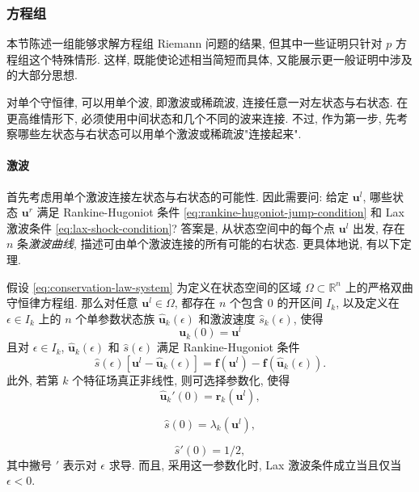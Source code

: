 \subsubsection{方程组}\label{subsec:systems-riemann-problems}

本节陈述一组能够求解方程组 Riemann 问题的结果, 但其中一些证明只针对 $p$ 方程组这个特殊情形. 这样, 既能使论述相当简短而具体, 又能展示更一般证明中涉及的大部分思想.

对单个守恒律, 可以用单个波, 即激波或稀疏波, 连接任意一对左状态与右状态. 在更高维情形下, 必须使用中间状态和几个不同的波来连接. 不过, 作为第一步, 先考察哪些左状态与右状态可以用单个激波或稀疏波"连接起来".

\paragraph*{激波}

首先考虑用单个激波连接左状态与右状态的可能性. 因此需要问: 给定 $\bm{u}^l$, 哪些状态 $\bm{u}^r$ 满足 Rankine-Hugoniot 条件 \eqref{eq:rankine-hugoniot-jump-condition} 和 Lax 激波条件 \eqref{eq:lax-shock-condition}? 答案是, 从状态空间中的每个点 $\bm{u}^l$ 出发, 存在 $n$ 条\emph{激波曲线}, 描述可由单个激波连接的所有可能的右状态. 更具体地说, 有以下定理.

\begin{Theorem}
\label{thm:shock-curves-existence}
假设 \eqref{eq:conservation-law-system} 为定义在状态空间的区域 $\Omega\subset\mathbb{R}^n$ 上的严格双曲守恒律方程组. 那么对任意 $\bm{u}^l\in\Omega$, 都存在 $n$ 个包含 $0$ 的开区间 $I_k$, 以及定义在 $\epsilon\in I_k$ 上的 $n$ 个单参数状态族 $\hat{\bm{u}}_k(\epsilon)$ 和激波速度 $\hat s_k(\epsilon)$, 使得
\begin{equation}\label{eq:shock-curve-base-state}
\bm{u}_k(0)=\bm{u}^l
\end{equation}
且对 $\epsilon\in I_k$, $\hat{\bm{u}}_k(\epsilon)$ 和 $\hat s(\epsilon)$ 满足 Rankine-Hugoniot 条件
\[
\hat s(\epsilon)[\bm{u}^l-\hat{\bm{u}}_k(\epsilon)]=\bm{f}(\bm{u}^l)-\bm{f}(\hat{\bm{u}}_k(\epsilon)).
\]
此外, 若第 $k$ 个特征场真正非线性, 则可选择参数化, 使得
\begin{equation}\label{eq:shock-curve-initial-tangent}
\hat{\bm{u}}_k'(0)=\bm{r}_k(\bm{u}^l),
\end{equation}

\begin{equation}\label{eq:shock-curve-initial-speed}
\hat s(0)=\lambda_k(\bm{u}^l),
\end{equation}

\begin{equation}\label{eq:shock-curve-initial-speed-derivative}
\hat s'(0)=1/2,
\end{equation}
其中撇号 $'$ 表示对 $\epsilon$ 求导. 而且, 采用这一参数化时, Lax 激波条件成立当且仅当 $\epsilon<0$.
\end{Theorem}

